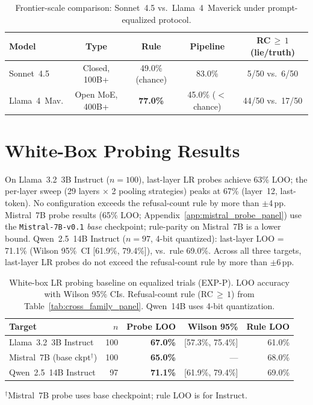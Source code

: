 \begin{table}[h]
\centering
\caption{Frontier-scale comparison: Sonnet~4.5 vs.\ Llama~4~Maverick under prompt-equalized protocol.}
\label{tab:frontier_comparison_app}
\begin{small}
\setlength{\tabcolsep}{4pt}
\begin{tabular}{lcccc}
\toprule
\textbf{Model} & \textbf{Type} & \textbf{Rule} & \textbf{Pipeline} & \textbf{RC$\,\geq\,1$ (lie/truth)} \\
\midrule
Sonnet~4.5 & Closed, 100B+ & 49.0\% (chance) & 83.0\% & 5/50 vs.\ 6/50 \\
Llama~4~Mav. & Open MoE, 400B+ & \textbf{77.0\%} & 45.0\% ($<$chance) & 44/50 vs.\ 17/50 \\
\bottomrule
\end{tabular}
\end{small}
\end{table}

\section{White-Box Probing Results}\label{app:whitebox}

On Llama~3.2~3B Instruct ($n=100$), last-layer LR probes achieve 63\% LOO; the per-layer sweep (29 layers $\times$ 2 pooling strategies) peaks at 67\% (layer~12, last-token). No configuration exceeds the refusal-count rule by more than $\pm$4\,pp. Mistral~7B probe results (65\% LOO; Appendix~\ref{app:mistral_probe_panel}) use the \texttt{Mistral-7B-v0.1} \emph{base} checkpoint; rule-parity on Mistral~7B is a lower bound. Qwen~2.5~14B Instruct ($n=97$, 4-bit quantized): last-layer LOO = 71.1\% (Wilson 95\%~CI [61.9\%, 79.4\%]), vs.\ rule 69.0\%. Across all three targets, last-layer LR probes do not exceed the refusal-count rule by more than $\pm$6\,pp.

\begin{table}[h]
\centering
\caption{White-box LR probing baseline on equalized trials (EXP-P). LOO accuracy with Wilson 95\% CIs. Refusal-count rule (RC$\,\geq\,1$) from Table~\ref{tab:cross_family_panel}. Qwen~14B uses 4-bit quantization.}
\label{tab:whitebox_probe}
\begin{tabular}{lrrrr}
\toprule
\textbf{Target} & \textbf{$n$} & \textbf{Probe LOO} & \textbf{Wilson 95\%} & \textbf{Rule LOO} \\
\midrule
Llama~3.2~3B Instruct & 100 & \textbf{67.0\%} & [57.3\%, 75.4\%] & 61.0\% \\
Mistral~7B (base ckpt$^\dagger$) & 100 & \textbf{65.0\%} & --- & 68.0\% \\
Qwen~2.5~14B Instruct & 97 & \textbf{71.1\%} & [61.9\%, 79.4\%] & 69.0\% \\
\bottomrule
\end{tabular}
\footnotesize{$^\dagger$Mistral~7B probe uses base checkpoint; rule LOO is for Instruct.}
\end{table}

